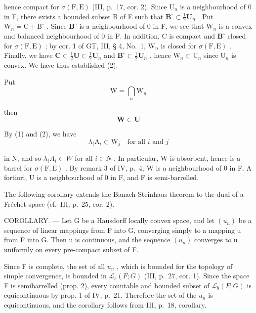 hence compact for \(\sigma(\mathrm{F},\mathrm{E})\) (III, p.~17, cor. 2). Since \(\mathrm{U}_n\) is a neighbourhood of 0 in F, there exists a bounded subset B of E such that \(\mathbf{B}^{\circ}\subset\frac{1}{2}\mathbf{U}_{n}\) . Put \(\mathrm{W}_n=\mathrm{C}+\mathrm{B}^{\circ}\) . Since \(\mathbf{B}^{\circ}\) is a neighbourhood of 0 in F, we see that \(\mathrm{W}_n\) is a convex and balanced neighbourhood of 0 in F. In addition, C is compact and \(\mathbf{B}^{\circ}\) closed for \(\sigma(\mathrm{F},\mathrm{E})\) ; by cor. 1 of GT, III, § 4, No.~1, \(\mathrm{W}_n\) is closed for \(\sigma(\mathrm{F},\mathrm{E})\) . Finally, we have \(\mathbf{C}\subset\frac{1}{2}\mathbf{U}\subset\frac{1}{2}\mathbf{U}_n\) and \(\mathbf{B}^{\circ}\subset\frac{1}{2}\mathbf{U}_n\) , hence \(\mathrm{W}_n\subset\mathrm{U}_n\) since \(\mathrm{U}_n\) is convex. We have thus established (2).

Put
\[
\mathrm{W} = \bigcap_ {n} \mathrm{W} _ {n}
\]

then
\[
\mathbf {W} \subset \mathbf {U}
\]

By (1) and (2), we have
\[
\lambda_ {i} \mathrm{A} _ {i} \subset \mathrm{W} _ {j} \quad \text {for all } i \text { and } j
\]

in N, and so \(\lambda_{i}A_{i}\subset W\) for all \(i\in N\) . In particular, W is absorbent, hence is a barrel for \(\sigma(\mathrm{F},\mathrm{E})\) . By remark 3 of IV, p.~4, W is a neighbourhood of 0 in F. A fortiori, U is a neighbourhood of 0 in F, and F is semi-barrelled.

The following corollary extends the Banach-Steinhaus theorem to the dual of a Fréchet space (cf.~III, p.~25, cor. 2).

COROLLARY. --- Let G be a Hausdorff locally convex space, and let \((u_{n})\) be a sequence of linear mappings from F into G, converging simply to a mapping u from F into G. Then u is continuous, and the sequence \((u_{n})\) converges to u uniformly on every pre-compact subset of F.

Since F is complete, the set of all \(u_{n}\) , which is bounded for the topology of simple convergence, is bounded in \(\mathcal{L}_{b}(F;G)\) (III, p.~27, cor. 1). Since the space F is semibarrelled (prop. 2), every countable and bounded subset of \(\mathcal{L}_{b}(F;G)\) is equicontinuous by prop. 1 of IV, p.~21. Therefore the set of the \(u_{n}\) is equicontinuous, and the corollary follows from III, p.~18, corollary.


